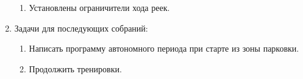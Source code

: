\begin{enumerate}
\begin{enumerate}
        \item Установлены ограничители хода реек.
		
	\end{enumerate}
	
	\item Задачи для последующих собраний:
	\begin{enumerate}
		
		\item Написать программу автономного периода при старте из зоны парковки.
		
		\item Продолжить тренировки.
			
	\end{enumerate}
\end{enumerate}
\fillpage

